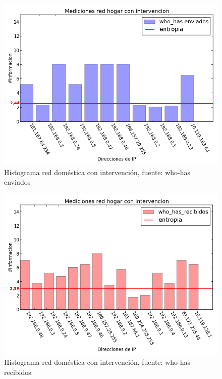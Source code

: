 \begin{figure}[!h]
	\begin{center}
		  \includegraphics[scale=0.4]{Graficos/hogar_con_sent_who_has.png}
		  \caption{Histograma red doméstica con intervención, fuente: who-has enviados}
		  \label{fig:contra1}
	\end{center}
\end{figure}

\begin{figure}[!h]
	\begin{center}
		  \includegraphics[scale=0.4]{Graficos/hogar_con_received_who_has.png}
		  \caption{Histograma red doméstica con intervención, fuente: who-has recibidos}
		  \label{fig:contra1}
	\end{center}
\end{figure}

